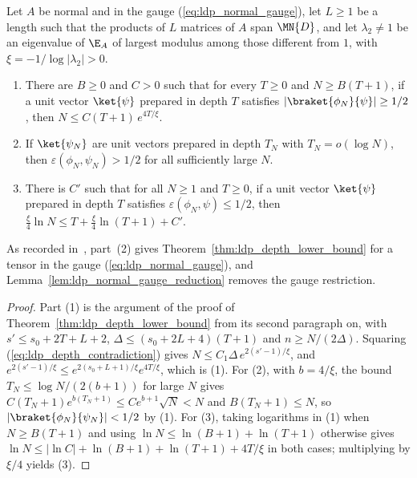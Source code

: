 \begin{lemma}
    \label{thm:ldp_depth_lower_bound_gauge}
    \leanok
    Let $A$ be normal and in the gauge (\ref{eq:ldp_normal_gauge}), let $L\ge1$
    be a length such that the products of $L$ matrices of $A$ span $\MN{D}$,
    and let $\lambda_2\neq1$ be an eigenvalue of $\E_A$ of largest modulus
    among those different from $1$, with $\xi=-1/\log\lvert\lambda_2\rvert>0$.
    \begin{enumerate}
        \item There are $B\ge0$ and $C>0$ such that for every $T\ge0$ and
              $N\ge B(T+1)$, if a unit vector $\ket{\psi}$ prepared in depth $T$
              satisfies $\lvert\braket{\phi_N}{\psi}\rvert\ge1/2$, then
              $N\le C(T+1)\,e^{4T/\xi}$.
        \item If $\ket{\psi_N}$ are unit vectors prepared in depth $T_N$ with
              $T_N=o(\log N)$, then $\varepsilon(\phi_N,\psi_N)>1/2$ for all
              sufficiently large $N$.
        \item There is $C'$ such that for all $N\ge1$ and $T\ge0$, if a unit
              vector $\ket{\psi}$ prepared in depth $T$ satisfies
              $\varepsilon(\phi_N,\psi)\le1/2$, then
              $\frac\xi4\ln N\le T+\frac\xi4\ln(T+1)+C'$.
    \end{enumerate}
    As recorded in~\cite{gap:mswc24_depth_lower_bound_gauge}, part~(2) gives
    Theorem~\ref{thm:ldp_depth_lower_bound} for a tensor in the
    gauge (\ref{eq:ldp_normal_gauge}), and Lemma~\ref{lem:ldp_normal_gauge_reduction}
    removes the gauge restriction.
\end{lemma}
\begin{proof}
    \leanok
    Part (1) is the argument of the proof of
    Theorem~\ref{thm:ldp_depth_lower_bound} from its second paragraph on, with $s'\le s_0+2T+L+2$,
    $\Delta\le(s_0+2L+4)(T+1)$ and $n\ge N/(2\Delta)$. Squaring
    (\ref{eq:ldp_depth_contradiction}) gives
    $N\le C_1\Delta\,e^{2(s'-1)/\xi}$, and
    $e^{2(s'-1)/\xi}\le e^{2(s_0+L+1)/\xi}e^{4T/\xi}$, which is (1). For (2),
    with $b=4/\xi$, the bound $T_N\le\log N/(2(b+1))$ for large $N$ gives
    $C(T_N+1)e^{b(T_N+1)}\le Ce^{b+1}\sqrt N<N$ and $B(T_N+1)\le N$, so
    $\lvert\braket{\phi_N}{\psi_N}\rvert<1/2$ by (1). For (3), taking
    logarithms in (1) when $N\ge B(T+1)$ and using
    $\ln N\le\ln(B+1)+\ln(T+1)$ otherwise gives
    $\ln N\le\lvert\ln C\rvert+\ln(B+1)+\ln(T+1)+4T/\xi$ in both cases;
    multiplying by $\xi/4$ yields (3).
\end{proof}

